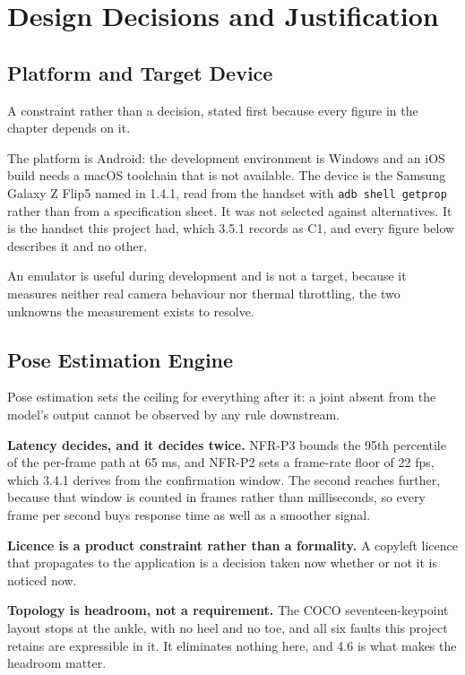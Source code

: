 \chapter{Design Decisions and Justification}
\label{chap:4}

\section{Platform and Target Device}
\label{sec:4.1}

A constraint rather than a decision, stated first because every figure in the chapter depends on it.

The platform is Android: the development environment is Windows and an iOS build needs a macOS toolchain that is not available. The device is the Samsung Galaxy Z Flip5 named in 1.4.1, read from the handset with \texttt{adb shell \allowbreak{}getprop} rather than from a specification sheet. It was not selected against alternatives. It is the handset this project had, which 3.5.1 records as C1, and every figure below describes it and no other.

An emulator is useful during development and is not a target, because it measures neither real camera behaviour nor thermal throttling, the two unknowns the measurement exists to resolve.

\section{Pose Estimation Engine}
\label{sec:4.2}

Pose estimation sets the ceiling for everything after it: a joint absent from the model's output cannot be observed by any rule downstream.

\textbf{Latency decides, and it decides twice.} NFR-P3 bounds the 95th percentile of the per-frame path at 65 ms, and NFR-P2 sets a frame-rate floor of 22 fps, which 3.4.1 derives from the confirmation window. The second reaches further, because that window is counted in frames rather than milliseconds, so every frame per second buys response time as well as a smoother signal.

\textbf{Licence is a product constraint rather than a formality.} A copyleft licence that propagates to the application is a decision taken now whether or not it is noticed now.

\textbf{Topology is headroom, not a requirement.} The COCO seventeen-keypoint layout stops at the ankle, with no heel and no toe, and all six faults this project retains are expressible in it. It eliminates nothing here, and 4.6 is what makes the headroom matter.

